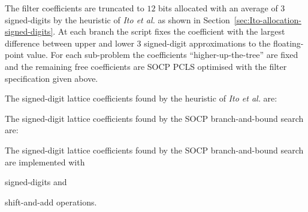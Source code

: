 \documentclass[a4paper,twoside,10pt,english]{report}
\begin{document}
The filter coefficients are truncated to $12$ bits allocated with an average
of $3$ signed-digits by the heuristic of \emph{Ito et al.} as shown in
Section~\ref{sec:Ito-allocation-signed-digits}.
At each branch the script fixes the coefficient with the largest difference
between upper and lower $3$ signed-digit approximations to the floating-point
value. For each sub-problem the coefficients ``higher-up-the-tree'' are fixed
and the remaining free coefficients are SOCP PCLS optimised with the filter 
specification given above.

The signed-digit lattice coefficients found by the heuristic of
\emph{Ito et al.} are:
\begin{small}


\end{small}

The signed-digit lattice coefficients found by the SOCP branch-and-bound
search are:
\begin{small}


\end{small}
The signed-digit lattice coefficients found by the SOCP branch-and-bound
search are implemented with 

signed-digits and 

shift-and-add operations.
\end{document}

